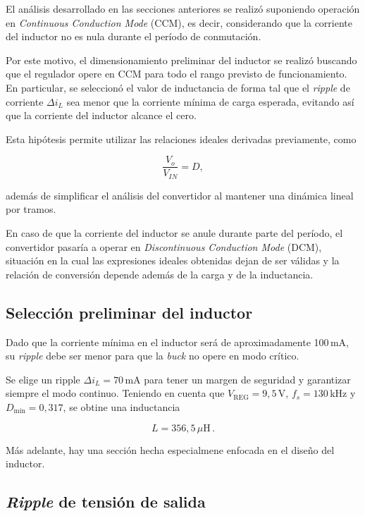 \documentclass[a4paper,12pt]{article}
\begin{document}
El análisis desarrollado en las secciones anteriores se realizó suponiendo operación en \textit{Continuous Conduction Mode} (CCM), es decir, considerando que la corriente del inductor no es nula durante el período de conmutación.

Por este motivo, el dimensionamiento preliminar del inductor se realizó buscando que el regulador opere en CCM para todo el rango previsto de funcionamiento. En particular, se seleccionó el valor de inductancia de forma tal que el \textit{ripple} de corriente $\Delta i_L$ sea menor que la corriente mínima de carga esperada, evitando así que la corriente del inductor alcance el cero.

Esta hipótesis permite utilizar las relaciones ideales derivadas previamente, como

\begin{equation}
\frac{V_o}{V_{IN}} = D,
\end{equation}

además de simplificar el análisis del convertidor al mantener una dinámica lineal por tramos.

En caso de que la corriente del inductor se anule durante parte del período, el convertidor pasaría a operar en \textit{Discontinuous Conduction Mode} (DCM), situación en la cual las expresiones ideales obtenidas dejan de ser válidas y la relación de conversión depende además de la carga y de la inductancia.

\subsection{Selección preliminar del inductor}

\label{sec:inductor}

Dado que la corriente mínima en el inductor será de aproximadamente 100$\,$mA, su \textit{ripple} debe ser menor para que la \textit{buck} no opere en modo crítico. 

Se elige un ripple $\Delta i_L = 70\,$mA para tener un margen de seguridad y garantizar siempre el modo continuo. Teniendo en cuenta que $V_\text{REG} = 9,5\,$V, $f_s = 130\,$kHz y $D_\text{min} = 0,317$, se obtine una inductancia 

\[
L = 356,5\,\mu\text{H}\,.
\]

Más adelante, hay una sección hecha especialmene enfocada en el diseño del inductor.

\subsection{\textit{Ripple} de tensión de salida}
\end{document}
